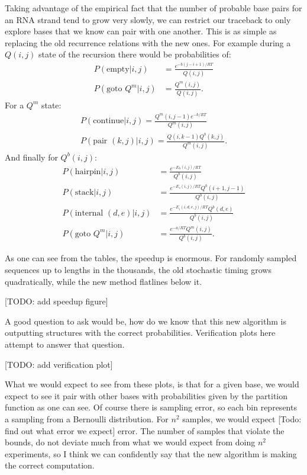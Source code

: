 Taking advantage of the empirical fact that the number of probable
base pairs for an RNA strand tend to grow very slowly, we can restrict
our traceback to only explore bases that we know can pair with one
another. This is as simple as replacing the old recurrence relations
with the new ones. For example during a $Q(i,j)$ state of the
recursion there would be probabilities of:
\begin{align}
P(\text{empty} | i, j) &= \frac{e^{-b(j-i+1)/RT}}{Q(i,j)}\\
P(\text{goto } Q^m | i, j) &= \frac{Q^m(i, j) }{Q(i, j) }.
\end{align}
For a $Q^m$ state:
\begin{align}
P(\text{continue} | i, j) = \frac{Q^m(i, j -1) e^{-b/RT}} {Q^m(i, j) }\\
P(\text{pair } (k, j) | i, j) = \frac{Q(i, k - 1) Q^b(k, j) } {Q^m(i,j) }.
\end{align}
And finally for $Q^b(i, j)$:
\begin{align}
P(\text{hairpin} | i, j) &= \frac{ e^{-E_h(i,j)/RT} } { Q^b(i,j) } \\
P(\text{stack} | i, j ) &= \frac{ e^{-E_s(i,j)/RT} Q^b(i+1, j-1) } {Q^b(i,j)}  \\
P(\text{internal } (d, e) | i, j) &= \frac{e^{-E_i(i, d, e, j)/RT} Q^b(d,e)}{Q^b(i,j) }\\
P(\text{goto } Q^m |i, j ) &= \frac{ e^{-a/RT} Q^m(i,j) } { Q^b(i,j)}. 
\end{align}

As one can see from the tables, the speedup is enormous. For randomly
sampled sequences up to lengths in the thousands, the old stochastic
timing grows quadratically, while the new method flatlines below it.

[TODO: add speedup figure]

A good question to ask would be, how do we know that this new
algorithm is outputting structures with the correct
probabilities. Verification plots here attempt to answer that
question.

[TODO: add verification plot]

What we would expect to see from these plots, is that for a given
base, we would expect to see it pair with other bases with
probabilities given by the partition function as one can see. Of
course there is sampling error, so each bin represents a sampling from
a Bernoulli distribution. For $n^2$ samples, we would expect [Todo: find
out what error we expect] error. The number of samples that violate
the bounds, do not deviate much from what we would expect from doing
$n^2$ experiments, so I think we can confidently say that the new
algorithm is making the correct computation.

